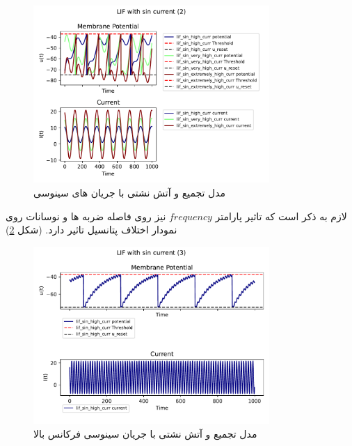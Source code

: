 \documentclass{article}
\begin{document}
                \begin{figure}[H]
                    \centering
                    \includegraphics[width=0.8\textwidth]{plots/LIF with sin current (2).pdf} 
                    \caption{مدل تجمیع و آتش نشتی با جریان های سینوسی}
                    \label{fig:lif-sin-amp-change-curr}
                \end{figure}

                لازم به ذکر است که تاثیر پارامتر 
                $frequency$ 
                نیز روی فاصله ضربه ها و نوسانات روی نمودار اختلاف پتانسیل تاثیر دارد.
                (شکل \ref{fig:lif-sin-high-freq-curr})
                \begin{figure}[H]
                    \centering
                    \includegraphics[width=0.8\textwidth]{plots/LIF with sin current (3).pdf} 
                    \caption{مدل تجمیع و آتش نشتی با جریان سینوسی فرکانس بالا}
                    \label{fig:lif-sin-high-freq-curr}
                \end{figure}
\end{document}
